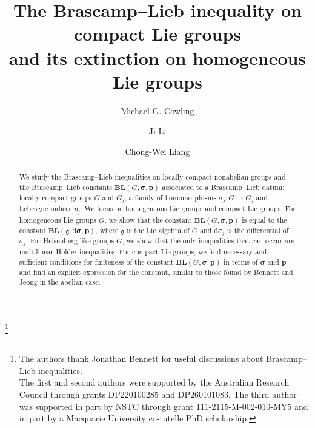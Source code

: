 \documentclass[12pt,twoside,a4paper]{amsart}
\theoremstyle{definition}
\theoremstyle{remark}
\numberwithin{equation}{section}
\begin{document}
\thanks{
The authors thank Jonathan Bennett for useful discussions about Brascamp--Lieb inequalities. \\  
The first and second authors were supported by the Australian Research Council through grants DP220100285 and DP260101083. 
The third author was supported in part by NSTC through grant 111-2115-M-002-010-MY5 and in part by a Macquarie University co-tutelle PhD scholarship.}


\title[Brascamp--Lieb inequalities]{The Brascamp--Lieb inequality on compact Lie groups \\ and its extinction on homogeneous Lie groups}
\author{Michael G. Cowling} 
\address{School of Mathematics and Statistics\\ University of New South Wales\\ Sydney NSW 2052\\ Australia}
\author{Ji Li} 
\address{School of Mathematical and Physical Sciences\\ Macquarie University\\ NSW 2109\\ Australia.}

\author{Chong-Wei Liang}
\address{Department of Mathematics, National Taiwan University, Taiwan.}

\date{}

\begin{abstract}
We study the Brascamp--Lieb inequalities on locally compact nonabelian groups and the Brascamp--Lieb constants $\mathbf{BL}(G, \boldsymbol{\sigma}, \boldsymbol{p})$ associated to a Brascamp--Lieb datum: locally compact groups $G$ and $G_j$, a family of homomorphisms $\sigma_j\colon  G \to G_j$ and Lebesgue indices $p_j$.
We focus on homogeneous Lie groups and compact Lie groups.
For homogeneous Lie groups $G$, we show that the constant $\mathbf{BL}(G, \boldsymbol{\sigma}, \boldsymbol{p})$  is equal to the constant $\mathbf{BL}(\mathfrak{g}, \boldsymbol{\mathrm{d}\sigma}, \boldsymbol{p})$, where $\mathfrak{g}$ is the Lie algebra of $G$ and $\mathrm{d}\sigma_j$ is the differential of $\sigma_j$.
For Heisenberg-like groups $G$, we show that the only inequalities that can occur are multilinear Hölder inequalities.
For compact Lie groups, we find necessary and sufficient conditions for finiteness of the constant $\mathbf{BL}(G, \boldsymbol{\sigma}, \boldsymbol{p})$ in terms of $\boldsymbol{\sigma}$ and $\boldsymbol{p}$ and find an explicit expression for the constant, similar to those found by Bennett and Jeong in the abelian case.
\end{abstract}
\end{document}
